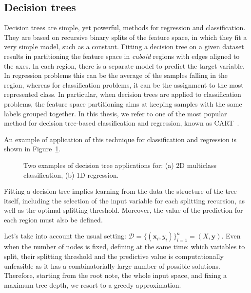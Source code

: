 		\subsection{Decision trees} \label{sec:decision_trees} 
		Decision trees are simple, yet powerful, methods for regression and classification.
		They are based on recursive binary splits of the feature space, in which they fit a very simple model, such as a constant.
		Fitting a decision tree on a given dataset results in partitioning the feature space in \textit{cuboid} regions with edges aligned to the axes.
		In each region, there is a separate model to predict the target variable. In regression problems this can be the average of the samples falling in the region, whereas for classification problems, it can be the assignment to the most represented class.
		In particular, when decision trees are applied to classification problems, the feature space partitioning aims at keeping samples with the same labels grouped together.
		In this thesis, we refer to one of the most popular method for decision tree-based classification and regression, known as \ac{CART}~\cite{breiman1984classification}.
		
		An example of application of this technique for classification and regression is shown in Figure~\ref{fig:decision_trees}.
		
		\begin{figure}[!ht]
			\centering
			\hfill%
			\caption{Two examples of decision tree applications for: (a) 2D multiclass classification, (b) 1D regression.}\label{fig:decision_trees}
		\end{figure}
		
		Fitting a decision tree implies learning from the data the structure of the tree itself, including the selection of the input variable for each splitting recursion, as well as the optimal splitting threshold. Moreover, the value of the prediction for each region must also be defined.
		
		Let's take into account the usual setting: $\mathcal{D} = \{(\bm{x}_i, y_i)\}_{i=1}^n = (X, \bm{y})$. Even when the number of nodes is fixed, defining at the same time: which variables to split, their splitting threshold and the predictive value is computationally unfeasible as it has a combinatorially large number of possible solutions. Therefore, starting from the root note, \ie the whole input space, and fixing a maximum tree depth, we resort to a greedy approximation.
		
